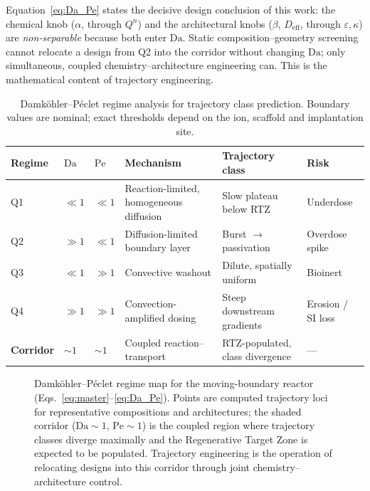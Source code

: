 \documentclass[11pt]{article}
\newcommand{\tablesize}{\fontsize{8.5pt}{10pt}\selectfont}
\newcommand{\Veff}{D_{\mathrm{eff}}}
\begin{document}
Equation~\eqref{eq:Da_Pe} states the decisive design conclusion of this work: the chemical knob ($\alpha$, through $Q^n$) and the architectural knobs ($\beta$, $\Veff$, through $\varepsilon,\kappa$) are \emph{non-separable} because both enter $\mathrm{Da}$. Static composition--geometry screening cannot relocate a design from Q2 into the corridor without changing $\mathrm{Da}$; only simultaneous, coupled chemistry--architecture engineering can. This is the mathematical content of trajectory engineering.


 \begin{table}[htbp]
\centering
\caption{Damk\"ohler--P\'eclet regime analysis for trajectory class prediction. Boundary values are nominal; exact thresholds depend on the ion, scaffold and implantation site.}
\label{tab:regimes}
\tablesize
\begin{tabular}{L{1.9cm} C{1.5cm} C{1.5cm} L{4.3cm} L{3.0cm} L{2.4cm}}
\toprule
{}
\textbf{Regime} & $\mathrm{Da}$ & $\mathrm{Pe}$ & \textbf{Mechanism} & \textbf{Trajectory class} & \textbf{Risk} \\
\midrule
Q1 & $\ll1$ & $\ll1$ & Reaction-limited, homogeneous diffusion & Slow plateau below RTZ & Underdose \\
Q2 & $\gg1$ & $\ll1$ & Diffusion-limited boundary layer & Burst $\rightarrow$ passivation & Overdose spike \\
Q3 & $\ll1$ & $\gg1$ & Convective washout & Dilute, spatially uniform & Bioinert \\
Q4 & $\gg1$ & $\gg1$ & Convection-amplified dosing & Steep downstream gradients & Erosion / SI loss \\
\textbf{Corridor} & $\sim1$ & $\sim1$ & Coupled reaction--transport & RTZ-populated, class divergence & --- \\
\bottomrule
\end{tabular}
\end{table}

\vspace{0.8em}

\begin{figure}[htbp]
\centering

\caption{Damk\"ohler--P\'eclet regime map for the moving-boundary reactor (Eqs.~\eqref{eq:master}--\eqref{eq:Da_Pe}). Points are computed trajectory loci for representative compositions and architectures; the shaded corridor ($\mathrm{Da}\sim1$, $\mathrm{Pe}\sim1$) is the coupled region where trajectory classes diverge maximally and the Regenerative Target Zone is expected to be populated. Trajectory engineering is the operation of relocating designs into this corridor through joint chemistry--architecture control.}
\label{fig:dape}
\end{figure}
\end{document}
